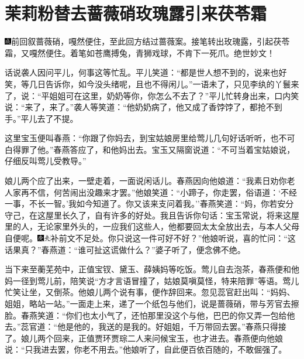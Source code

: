 

\chapter{茉莉粉替去蔷薇硝\hspace{.5em}玫瑰露引来茯苓霜}

{\includegraphics[width=3mm]{../Images/00005}前回叙蔷薇硝，嘎然便住，至此回方结过蔷薇案。接笔转出玫瑰露，引起茯苓霜，又嘎然便住。着笔如苍鹰搏兔，青狮戏球，不肯下一死爪。绝世妙文！}

话说袭人因问平儿，何事这等忙乱。平儿笑道：``都是世人想不到的，说来也好笑，等几日告诉你，如今没头绪呢，且也不得闲儿。''一语未了，只见李纨的丫鬟来了，说：``平姐姐可在这里，奶奶等你，你怎么不去了？''平儿忙转身出来，口内笑说：``来了，来了。''袭人等笑道：``他奶奶病了，他又成了香饽饽了，都抢不到手。''平儿去了不提。

这里宝玉便叫春燕：``你跟了你妈去，到宝姑娘房里给莺儿几句好话听听，也不可白得罪了他。''春燕答应了，和他妈出去。宝玉又隔窗说道：``不可当着宝姑娘说，仔细反叫莺儿受教导。''

娘儿两个应了出来，一壁走着，一面说闲话儿。春燕因向他娘道：``我素日劝你老人家再不信，何苦闹出没趣来才罢。''他娘笑道：``小蹄子，你走罢，俗语道：`不经一事，不长一智。'我如今知道了。你又该来支问着我。''春燕笑道：``妈，你若安分守己，在这屋里长久了，自有许多的好处。我且告诉你句话：宝玉常说，将来这屋里的人，无论家里外头的，一应我们这些人，他都要回太太全放出去，与本人父母自便呢。{\includegraphics[width=3mm]{../Images/00004}\includegraphics[width=3mm]{../Images/00012}\footnotesize \kaishu 补前文不足处。}你只说这一件可好不好？''他娘听说，喜的忙问：``这话果真？''春燕道：``谁可扯这谎做什么？''婆子听了，便念佛不绝。

当下来至蘅芜苑中，正值宝钗、黛玉、薛姨妈等吃饭。莺儿自去泡茶，春燕便和他妈一径到莺儿前，陪笑说``方才言语冒撞了，姑娘莫嗔莫怪，特来陪罪''等语。莺儿忙笑让坐，又倒茶。他娘儿两个说有事，便作辞回来。忽见蕊官赶出叫：``妈妈、姐姐，略站一站。''一面走上来，递了一个纸包与他们，说是蔷薇硝，带与芳官去擦脸。春燕笑道：``你们也太小气了，还怕那里没这个与他，巴巴的你又弄一包给他去。''蕊官道：``他是他的，我送的是我的。好姐姐，千万带回去罢。''春燕只得接了。娘儿两个回来，正值贾环贾琮二人来问候宝玉，也才进去。春燕便向他娘说：``只我进去罢，你老不用去。''他娘听了，自此便百依百随的，不敢倔强了。

